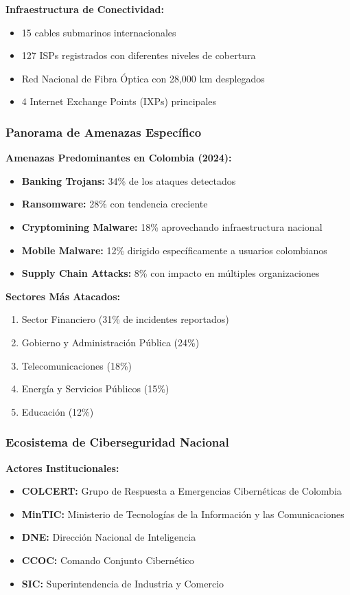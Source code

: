 \textbf{Infraestructura de Conectividad:}
\begin{itemize}
    \item 15 cables submarinos internacionales
    \item 127 ISPs registrados con diferentes niveles de cobertura
    \item Red Nacional de Fibra Óptica con 28,000 km desplegados
    \item 4 Internet Exchange Points (IXPs) principales
\end{itemize}

\subsubsection{Panorama de Amenazas Específico}
\textbf{Amenazas Predominantes en Colombia (2024):}
\begin{itemize}
    \item \textbf{Banking Trojans:} 34\% de los ataques detectados
    \item \textbf{Ransomware:} 28\% con tendencia creciente
    \item \textbf{Cryptomining Malware:} 18\% aprovechando infraestructura nacional
    \item \textbf{Mobile Malware:} 12\% dirigido específicamente a usuarios colombianos
    \item \textbf{Supply Chain Attacks:} 8\% con impacto en múltiples organizaciones
\end{itemize}

\textbf{Sectores Más Atacados:}
\begin{enumerate}
    \item Sector Financiero (31\% de incidentes reportados)
    \item Gobierno y Administración Pública (24\%)
    \item Telecomunicaciones (18\%)
    \item Energía y Servicios Públicos (15\%)
    \item Educación (12\%)
\end{enumerate}

\subsubsection{Ecosistema de Ciberseguridad Nacional}
\textbf{Actores Institucionales:}
\begin{itemize}
    \item \textbf{COLCERT:} Grupo de Respuesta a Emergencias Cibernéticas de Colombia
    \item \textbf{MinTIC:} Ministerio de Tecnologías de la Información y las Comunicaciones
    \item \textbf{DNE:} Dirección Nacional de Inteligencia
    \item \textbf{CCOC:} Comando Conjunto Cibernético
    \item \textbf{SIC:} Superintendencia de Industria y Comercio
\end{itemize}

